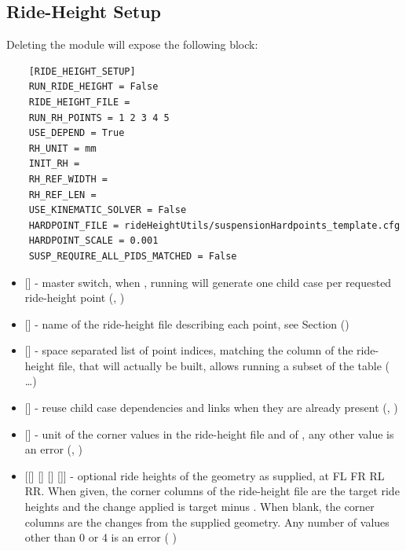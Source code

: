 \subsection{Ride-Height Setup}
Deleting the module  will expose the following block:
\begin{lstlisting}
    [RIDE_HEIGHT_SETUP]
    RUN_RIDE_HEIGHT = False
    RIDE_HEIGHT_FILE =
    RUN_RH_POINTS = 1 2 3 4 5
    USE_DEPEND = True
    RH_UNIT = mm
    INIT_RH =
    RH_REF_WIDTH =
    RH_REF_LEN =
    USE_KINEMATIC_SOLVER = False
    HARDPOINT_FILE = rideHeightUtils/suspensionHardpoints_template.cfg
    HARDPOINT_SCALE = 0.001
    SUSP_REQUIRE_ALL_PIDS_MATCHED = False
\end{lstlisting}
\begin{itemize}
    \item {} [] - master switch, when , running  will generate one child case per requested ride-height point (, )

    \item {} [] - name of the ride-height file describing each point, see Section  ()

    \item {} [] - space separated list of point indices, matching the  column of the ride-height file, that will actually be built, allows running a subset of the table (  \dots)

    \item {} [] - reuse child case dependencies and links when they are already present (, )

    \item {} [] - unit of the corner values in the ride-height file and of , any other value is an error (, )

    \item {} [[] [] [] []] - optional ride heights of the geometry as supplied, at FL FR RL RR. When given, the corner columns of the ride-height file are the target ride heights and the change applied is target minus . When blank, the corner columns are the changes from the supplied geometry. Any number of values other than 0 or 4 is an error (   )


\end{itemize}
